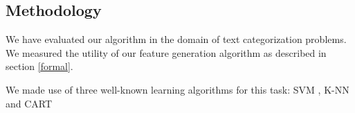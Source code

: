 \documentclass{article}
\theoremstyle{definition}
\begin{document}


\subsection{Methodology}

We have evaluated our algorithm in the domain of text categorization problems.
We measured the utility of our feature generation algorithm as described in section \ref{formal}.

 We made use of three well-known learning algorithms for this task: SVM \citep{cortes1995support}, K-NN \citep{fix1951discriminatory} and CART \citep{breiman1984classification}%
\end{document}
